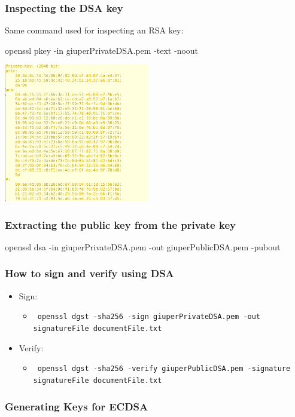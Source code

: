 \documentclass[]{beamer}
\begin{document}
{\begin{frame}
\frametitle{Inspecting the DSA key}

Same command used for inspecting an RSA key:

\centerline{\color{magenta} openssl pkey -in giuperPrivateDSA.pem -text -noout}

\vfill
\begin{center}
\includegraphics[width=2.5in]{imgs/dsaPrivate.png}
\end{center}
\end{frame}

\begin{frame}
\frametitle{Extracting the public key from the private key}
\vfill
\centerline{\color{magenta} openssl dsa -in giuperPrivateDSA.pem -out giuperPublicDSA.pem -pubout}
\vfill

\end{frame}

\begin{frame}
\frametitle{How to sign and verify using DSA}

\begin{itemize}
\item Sign:

\begin{itemize}
\item {\tt \color{magenta} 
    openssl dgst -sha256 -sign giuperPrivateDSA.pem -out signatureFile documentFile.txt
}
\end{itemize}
\vskip 1cm
\item Verify:
\begin{itemize}
\item {\tt \color{magenta} 
openssl dgst -sha256 -verify giuperPublicDSA.pem -signature signatureFile documentFile.txt
}
\end{itemize}
\end{itemize}
\end{frame}

\begin{frame}
\frametitle{Generating Keys for ECDSA}


\end{frame}}
\end{document}
